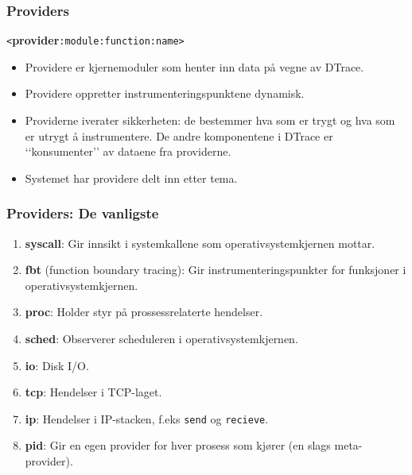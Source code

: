 \documentclass{beamer}
\begin{document}
 \begin{frame}
    \frametitle{Providers}
    \texttt{<}\textbf{provider}\texttt{:module:function:name>}
 \begin{itemize}

     \item Providere er kjernemoduler som henter inn data på vegne av DTrace.

     \item Providere oppretter instrumenteringspunktene dynamisk.

\item Providerne iverater sikkerheten: de bestemmer hva som er trygt og hva som
      er utrygt å instrumentere. De andre komponentene i DTrace er
      ‘‘konsumenter’’ av dataene fra providerne.

  \item Systemet har providere delt inn etter tema.
\end{itemize}
\end{frame}

 \begin{frame}
    \frametitle{Providers: De vanligste}

     \begin{enumerate}
         \item \textbf{syscall}: Gir innsikt i systemkallene som operativsystemkjernen mottar.
         \item \textbf{fbt} (function boundary tracing): Gir instrumenteringspunkter for
      funksjoner i operativsystemkjernen.
  \item \textbf{proc}: Holder styr på prossessrelaterte hendelser.
  \item \textbf{sched}: Observerer scheduleren i operativsystemkjernen.
  \item \textbf{io}: Disk I/O.
  \item \textbf{tcp}: Hendelser i TCP-laget.
  \item \textbf{ip}: Hendelser i IP-stacken,  f.eks \texttt{send} og \texttt{recieve}.
  \item \textbf{pid}: Gir en egen provider for hver prosess som kjører (en slags meta-provider).
     \end{enumerate}
 \end{frame}
\end{document}
